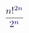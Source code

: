 \documentclass[12pt]{article}
\begin{document}
\makeatletter
\renewcommand*{\@textcolor}[3]{%
  \protect\leavevmode
  \begingroup
    \color#1{#2}#3%
  \endgroup
}
\makeatother
\begin{displaymath}
\mathcolor[RGB]{0,0,15}{\frac { \mathcolor[RGB]{0,0,30}{n} \mathcolor[RGB]{0,0,45}{!} ^ { \mathcolor[RGB]{0,0,60}{2} \mathcolor[RGB]{0,0,75}{n} } } { \mathcolor[RGB]{0,0,90}{2} ^ { \mathcolor[RGB]{0,0,105}{n} } } }
\end{displaymath}
\end{document}
